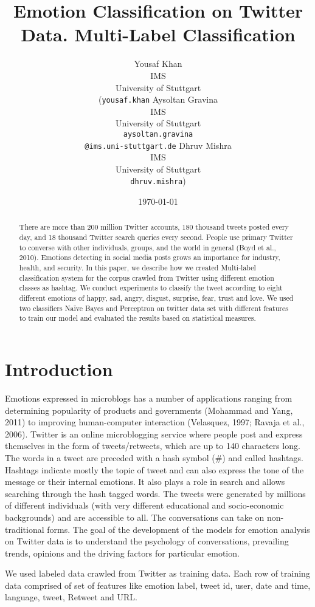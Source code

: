 \documentclass[11pt]{article}
\title{Emotion Classification on Twitter Data.
Multi-Label Classification
}
\author{
  Yousaf Khan\\
  IMS\\
  University of Stuttgart\\
  (\texttt{yousaf.khan}
\And
  Aysoltan Gravina\\
  IMS\\
  University of Stuttgart\\
  \texttt{aysoltan.gravina}\\
  \texttt{@ims.uni-stuttgart.de}
  \And
  Dhruv Mishra\\
  IMS\\
  University of Stuttgart\\
  \texttt{dhruv.mishra})
}
\date{\today}
\begin{document}
\maketitle
\begin{abstract}
  There are more than 200 million Twitter accounts, 180 thousand tweets posted every day, and 18 thousand Twitter search queries every second. People use primary Twitter to converse with other individuals, groups, and the world in general (Boyd et al., 2010). Emotions detecting in social media posts grows an importance for industry, health, and security.
In this paper, we describe how we created Multi-label classification system for the corpus crawled from Twitter using different emotion classes as hashtag. We conduct experiments to classify the tweet according to eight different emotions of happy, sad, angry, disgust, surprise, fear, trust and love. We used two classifiers Naïve Bayes and Perceptron on twitter data set with different features to train our model and evaluated the results based on statistical measures.


\end{abstract}



\section{Introduction}

Emotions expressed in microblogs has a number of applications ranging from determining popularity of products and governments (Mohammad and Yang, 2011) to improving human-computer interaction (Velasquez, 1997; Ravaja et al., 2006).
	Twitter is an online microblogging service where people post and express themselves in the form of tweets/retweets, which are up to 140 characters long. The words in a tweet are preceded with a hash symbol (\#) and called hashtags. Hashtags indicate mostly the topic of tweet and can also express the tone of the message or their internal emotions. It also plays a role in search and allows searching through the hash tagged words.
	The tweets were generated by millions of different individuals (with very different educational and socio-economic backgrounds) and are accessible to all. The conversations can take on non-traditional forms. The goal of the development of the models for emotion analysis on Twitter data is to understand the psychology of conversations, prevailing trends, opinions and the driving factors for particular emotion.

     We used labeled data crawled from Twitter as training data. Each row of training data comprised of set of features like emotion label, tweet id, user, date and time, language, tweet, Retweet and URL.
     
\end{document}
